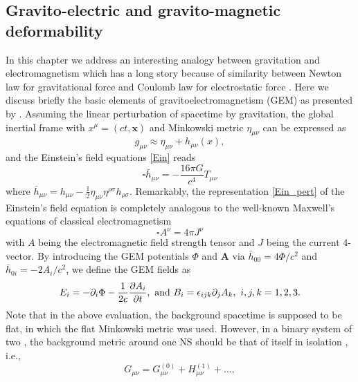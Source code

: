 \subsection{Gravito-electric and gravito-magnetic deformability}%
\label{sec3.2}
In this chapter we address an interesting analogy between gravitation and electromagnetism
which has a long story because of similarity between Newton law for gravitational 
force and Coulomb law for electrostatic force \cite{mashhoon2003gravitoelectromagnetism}.
Here we discuss briefly the basic elements of gravitoelectromagnetism (\gls{GEM}) as 
presented by \cite{damour2009relativistic}. Assuming the linear perturbation of spacetime
by gravitation, the global inertial frame with $x^{\mu} = (ct, \mathbf{x})$ and 
Minkowski metric $\eta_{\mu\nu}$ can be expressed as
\begin{equation}
    g_{\mu\nu} \approx \eta_{\mu\nu} + h_{\mu\nu}(x),
\end{equation}
and the Einstein's field equations \eqref{Ein} reads
\begin{equation}
  \square \bar{h}_{\mu\nu} = - \frac{16\pi G}{c^4} T_{\mu\nu} \label{Ein_pert}
\end{equation}
where $\bar{h}_{\mu\nu}=h_{\mu\nu}-\frac{1}{2}\eta_{\mu\nu}\eta^{\rho\sigma}h_{\rho\sigma}$. Remarkably, the representation \eqref{Ein_pert} of the Einstein's field equation is 
completely analogous to the well-known Maxwell's equations of classical electromagnetism
\begin{equation}
    \square A^\nu = 4\pi J^\nu
\end{equation}
with $A$ being the electromagnetic field strength tensor and $J$ being the current 
4-vector. By introducing the \gls{GEM} potentials $\Phi$ and $\mathbf{A}$ via 
$\bar{h}_{00}=4\Phi/c^2$ and $\bar{h}_{0i} = -2A_i/c^2$, we define the \gls{GEM} fields as
\begin{equation}
E_{i} = -\partial_i\Phi - \frac{1}{2c}\pdv{A_i}{t},\ {\rm and}\ 
B_i = \epsilon_{ijk}\partial_j A_k,\ i,j,k=1,2,3. \label{eq3.9}
\end{equation}
Note that in the above evaluation, the background spacetime is supposed to be flat, 
in which the flat Minkowski metric was used. However, in a binary system of two , 
the background metric around one \gls{NS} should be that of itself in isolation 
\citep{damour2009relativistic}, i.e., 
\begin{equation}
    G_{\mu\nu} = G^{(0)}_{\mu\nu} + H^{(1)}_{\mu\nu} + \ldots, \label{eq3.10} 
\end{equation}
